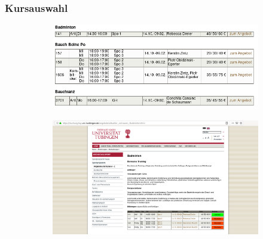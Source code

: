\documentclass{beamer}
\begin{document}
	\begin{frame}
	\frametitle{Kursauswahl}
	\begin{figure}
		\begin{subfigure}{0.35\textwidth}
			\includegraphics[width=\textwidth]{figures/screenshot_kursliste.png}
		\end{subfigure}
		\begin{subfigure}{0.35\textwidth}
			\includegraphics[width=\textwidth]{figures/screenshot_kurs.png}	
		\end{subfigure}	
	\end{figure}
	\end{frame}
	
\end{document}
